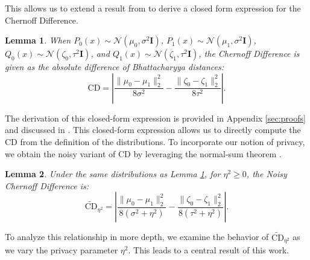 \documentclass[11pt,letterpaper]{article}
\newtheorem{lemma}{Lemma}
\begin{document}
This allows us to extend a result from \cite{dutta2020there} to derive a closed form expression for the Chernoff Difference.




\begin{lemma} \label{lemma} 
    When $P_0(x)\sim\mathcal{N}(\mu_0,\sigma^2\mathbf{I})$, $P_1(x)\sim\mathcal{N}(\mu_1,\sigma^2\mathbf{I})$, $Q_0(x)\sim\mathcal{N}(\zeta_0,\tau^2\mathbf{I})$, and $Q_1(x)\sim\mathcal{N}(\zeta_1,\tau^2\mathbf{I})$, the Chernoff Difference is given as the absolute difference of Bhattacharyya distances:
    \begin{equation}
        \text{CD} = \left|\frac{\|\mu_0 - \mu_1\|_2^2}{8\sigma^2} - \frac{\|\zeta_0 - \zeta_1\|_2^2}{8\tau^2}\right|.
    \end{equation}
     
\end{lemma}
The derivation of this closed-form expression is provided in Appendix \ref{sec:proofs} and discussed in \cite{nielsen2022revisiting}. This closed-form expression allows us to directly compute the CD from the definition of the distributions. To incorporate our notion of privacy, we obtain the noisy variant of CD by leveraging the normal-sum theorem \citep{lemons2002introduction}.

\begin{lemma} %
    Under the same distributions as Lemma \ref{lemma}, for $\eta^2\geq 0$, the Noisy Chernoff Difference is:
    \begin{equation}
        \widetilde{\text{CD}}_{\eta^2} = \left|\frac{\|\mu_0 - \mu_1\|_2^2}{8(\sigma^2+\eta^2)} - \frac{\|\zeta_0 - \zeta_1\|_2^2}{8(\tau^2+\eta^2)}\right|.
    \end{equation}
\end{lemma}
\vspace{-2mm}
To analyze this relationship in more depth, we examine the behavior of $\widetilde{\text{CD}}_{\eta^2}$ as we vary the privacy parameter $\eta^2$. This leads to a central result of this work.
\end{document}
